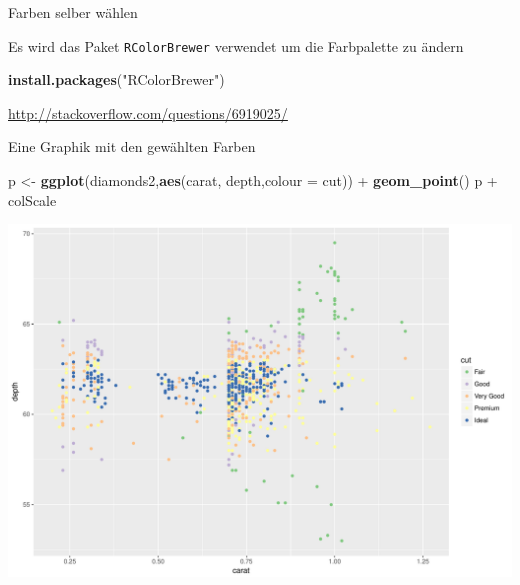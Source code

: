 \documentclass[ignorenonframetext,]{beamer}
\newenvironment{Shaded}{}{}
\newcommand{\KeywordTok}[1]{\textcolor[rgb]{0.00,0.44,0.13}{\textbf{{#1}}}}
\newcommand{\DataTypeTok}[1]{\textcolor[rgb]{0.56,0.13,0.00}{{#1}}}
\newcommand{\DecValTok}[1]{\textcolor[rgb]{0.25,0.63,0.44}{{#1}}}
\newcommand{\StringTok}[1]{\textcolor[rgb]{0.25,0.44,0.63}{{#1}}}
\newcommand{\NormalTok}[1]{{#1}}
\begin{document}
\begin{frame}[fragile]{Farben selber wählen}

Es wird das Paket \texttt{RColorBrewer} verwendet um die Farbpalette zu
ändern

\begin{Shaded}
\begin{Highlighting}[]
\KeywordTok{install.packages}\NormalTok{(}\StringTok{"RColorBrewer"}\NormalTok{)}
\end{Highlighting}
\end{Shaded}

\begin{Shaded}
\end{Shaded}

\url{http://stackoverflow.com/questions/6919025/}

\end{frame}

\begin{frame}[fragile]{Eine Graphik mit den gewählten Farben}

\begin{Shaded}
\begin{Highlighting}[]
\NormalTok{p <-}\StringTok{ }\KeywordTok{ggplot}\NormalTok{(diamonds2,}\KeywordTok{aes}\NormalTok{(carat, depth,}\DataTypeTok{colour =} \NormalTok{cut)) +}\StringTok{ }
\StringTok{  }\KeywordTok{geom_point}\NormalTok{()}
\NormalTok{p +}\StringTok{ }\NormalTok{colScale}
\end{Highlighting}
\end{Shaded}

\includegraphics{RSocialScience2_files/figure-beamer/unnamed-chunk-21-1.pdf}

\end{frame}
\end{document}
